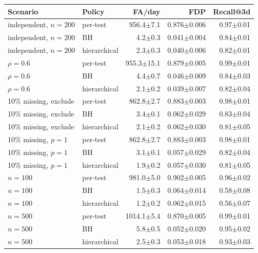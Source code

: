 \begin{tabular}{llrrr}
\toprule
Scenario & Policy & FA/day & FDP & Recall@3d \\
\midrule
independent, $n=200$ & per-test & 956.4$\pm$7.1 & 0.876$\pm$0.006 & 0.97$\pm$0.01 \\
independent, $n=200$ & BH & 4.2$\pm$0.3 & 0.041$\pm$0.004 & 0.84$\pm$0.01 \\
independent, $n=200$ & hierarchical & 2.3$\pm$0.3 & 0.040$\pm$0.006 & 0.82$\pm$0.01 \\
$\rho=0.6$ & per-test & 955.3$\pm$15.1 & 0.879$\pm$0.005 & 0.99$\pm$0.01 \\
$\rho=0.6$ & BH & 4.4$\pm$0.7 & 0.046$\pm$0.009 & 0.84$\pm$0.03 \\
$\rho=0.6$ & hierarchical & 2.1$\pm$0.2 & 0.039$\pm$0.007 & 0.82$\pm$0.04 \\
10\% missing, exclude & per-test & 862.8$\pm$2.7 & 0.883$\pm$0.003 & 0.98$\pm$0.01 \\
10\% missing, exclude & BH & 3.4$\pm$0.1 & 0.062$\pm$0.029 & 0.83$\pm$0.04 \\
10\% missing, exclude & hierarchical & 2.1$\pm$0.2 & 0.062$\pm$0.030 & 0.81$\pm$0.05 \\
10\% missing, $p{=}1$ & per-test & 862.8$\pm$2.7 & 0.883$\pm$0.003 & 0.98$\pm$0.01 \\
10\% missing, $p{=}1$ & BH & 3.1$\pm$0.1 & 0.057$\pm$0.029 & 0.82$\pm$0.04 \\
10\% missing, $p{=}1$ & hierarchical & 1.9$\pm$0.2 & 0.057$\pm$0.030 & 0.81$\pm$0.05 \\
$n=100$ & per-test & 981.0$\pm$5.0 & 0.902$\pm$0.005 & 0.96$\pm$0.02 \\
$n=100$ & BH & 1.5$\pm$0.3 & 0.064$\pm$0.014 & 0.58$\pm$0.08 \\
$n=100$ & hierarchical & 1.2$\pm$0.2 & 0.062$\pm$0.015 & 0.56$\pm$0.07 \\
$n=500$ & per-test & 1014.1$\pm$5.4 & 0.870$\pm$0.005 & 0.99$\pm$0.01 \\
$n=500$ & BH & 5.8$\pm$0.5 & 0.052$\pm$0.020 & 0.95$\pm$0.02 \\
$n=500$ & hierarchical & 2.5$\pm$0.3 & 0.053$\pm$0.018 & 0.93$\pm$0.03 \\
\bottomrule
\end{tabular}